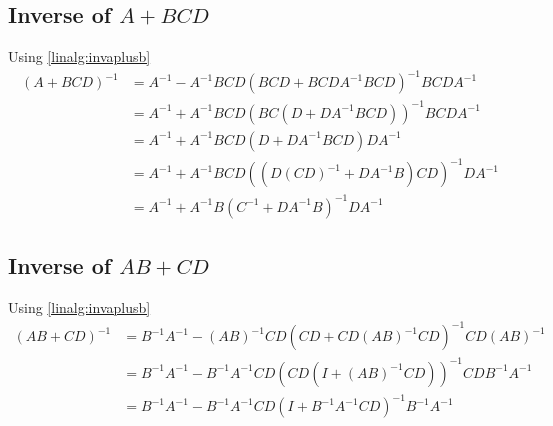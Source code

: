 \subsection{Inverse of $A+BCD$}
Using \eqref{linalg:invaplusb}
\begin{align}
(A+BCD)^{-1} &= A^{-1}-A^{-1}BCD(BCD + BCDA^{-1}BCD)^{-1}BCDA^{-1} \nonumber \\
&= A^{-1} + A^{-1}BCD(BC(D+DA^{-1}BCD))^{-1}BCDA^{-1} \nonumber \\
&= A^{-1} + A^{-1}BCD(D+DA^{-1}BCD)DA^{-1} \nonumber \\
&= A^{-1} + A^{-1}BCD((D(CD)^{-1}+DA^{-1}B)CD)^{-1}DA^{-1} \nonumber \\
&= A^{-1} + A^{-1}B(C^{-1} + DA^{-1}B)^{-1}DA^{-1}
\end{align}

\subsection{Inverse of $AB+CD$}
Using \eqref{linalg:invaplusb}
\begin{align}
(AB+CD)^{-1} &= B^{-1}A^{-1} - (AB)^{-1}CD(CD+CD(AB)^{-1}CD)^{-1}CD(AB)^{-1} \nonumber \\
&= B^{-1}A^{-1} - B^{-1}A^{-1}CD(CD(I+(AB)^{-1}CD))^{-1}CDB^{-1}A^{-1} \nonumber \\
&= B^{-1}A^{-1} - B^{-1}A^{-1}CD(I+B^{-1}A^{-1}CD)^{-1}B^{-1}A^{-1}
\end{align}